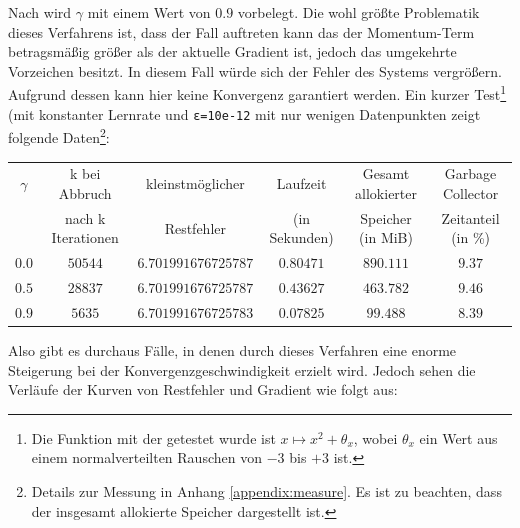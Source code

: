 \documentclass{article}
\theoremstyle{plain} %
\theoremstyle{definition} %
\begin{document}
Nach \cite[S. 110]{Lippe} wird $\gamma$ mit einem Wert von $0.9$ vorbelegt. Die wohl größte Problematik dieses Verfahrens ist, dass der Fall auftreten kann das der Momentum-Term betragsmäßig größer als der aktuelle Gradient ist, jedoch das umgekehrte Vorzeichen besitzt. In diesem Fall würde sich der Fehler des Systems vergrößern. Aufgrund dessen kann hier keine Konvergenz garantiert werden.
Ein kurzer Test\footnote{Die Funktion mit der getestet wurde ist $x \mapsto x^2+\theta_x$, wobei $\theta_x$ ein Wert aus einem normalverteilten Rauschen von $-3$ bis $+3$ ist.} (mit konstanter Lernrate und \texttt{ε=10e-12} mit nur wenigen Datenpunkten zeigt folgende Daten\footnote{Details zur Messung in Anhang \ref{appendix:measure}. Es ist zu beachten, dass der insgesamt allokierte Speicher dargestellt ist.}:

\begin{center}
  \begin{tabular}{cccccc}
    \toprule
    $\gamma$ & k bei Abbruch& kleinstmöglicher & Laufzeit & Gesamt allokierter & Garbage Collector\\
    &  nach k Iterationen & Restfehler  & (in Sekunden) & Speicher (in MiB) & Zeitanteil (in \%) \\
    \midrule
    $0.0$ & $50544$ & $6.701991676725787$ & $0.80471$ & $890.111$ & $9.37$ \\
    $0.5$ & $28837$ & $6.701991676725787$ & $0.43627$ & $463.782$ & $9.46$ \\
    $0.9$ & $5635$ & $6.701991676725783$ & $0.07825$ & $99.488$ & $8.39$ \\
  \end{tabular}
\end{center}

Also gibt es durchaus Fälle, in denen durch dieses Verfahren eine enorme Steigerung bei der Konvergenzgeschwindigkeit erzielt wird. Jedoch sehen die Verläufe der Kurven von Restfehler und Gradient wie folgt aus:
\end{document}
